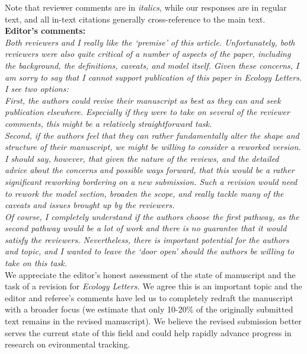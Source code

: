 \documentclass[11pt]{article}
\begin{document}
Note that reviewer comments are in \emph{italics}, while our responses are in regular text, and all in-text citations generally cross-reference to the main text.\\

{\bf Editor's comments:} \\

\emph{Both reviewers and I really like the `premise' of this article.  Unfortunately, both
reviewers were also quite critical of a number of aspects of the paper, including the
background, the definitions, caveats, and model itself.  Given these concerns, I am sorry to
say that I cannot support publication of this paper in Ecology Letters.  I see two options:}\\ 

\emph{First, the authors could revise their manuscript as best as they can and seek publication
elsewhere. Especially if they were to take on several of the reviewer comments, this might be
a relatively straightforward task.}\\

\emph{Second, if the authors feel that they can rather fundamentally alter the shape and structure
of their manuscript, we might be willing to consider a reworked version. I should say,
however, that given the nature of the reviews, and the detailed advice about the concerns and
possible ways forward, that this would be a rather significant reworking bordering on a new
submission. Such a revision would need to rework the model section, broaden the scope, and
really tackle many of the caveats and issues brought up by the reviewers.}\\

\emph{Of course, I completely understand if the authors choose the first pathway, as the second
pathway would be a lot of work and there is no guarantee that it would satisfy the reviewers.
Nevertheless, there is important potential for the authors and topic, and I wanted to leave
the `door open' should the authors be willing to take on this task.}\\

We appreciate the editor's honest assessment of the state of manuscript and the task of a revision for \emph{Ecology Letters.} We agree this is an important topic and the editor and referee's comments have led us to completely redraft the manuscript with a broader focus (we estimate that only 10-20\% of the originally submitted text remains in the revised manuscript). We believe the revised submission better serves the current state of this field and could help rapidly advance progress in research on evironmental tracking.\\
\end{document}
